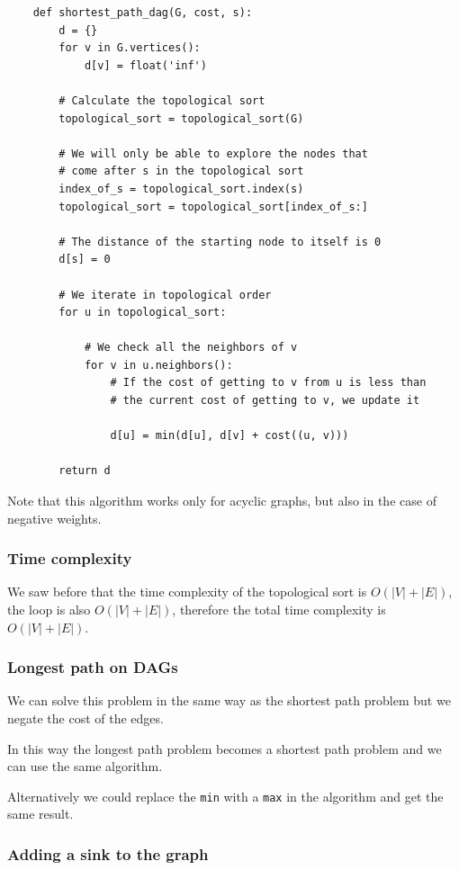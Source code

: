\documentclass[12pt]{extarticle}
\begin{document}
\begin{verbatim}
    def shortest_path_dag(G, cost, s):
        d = {}
        for v in G.vertices():
            d[v] = float('inf')

        # Calculate the topological sort
        topological_sort = topological_sort(G)

        # We will only be able to explore the nodes that
        # come after s in the topological sort
        index_of_s = topological_sort.index(s)
        topological_sort = topological_sort[index_of_s:]

        # The distance of the starting node to itself is 0
        d[s] = 0

        # We iterate in topological order
        for u in topological_sort:

            # We check all the neighbors of v
            for v in u.neighbors():
                # If the cost of getting to v from u is less than
                # the current cost of getting to v, we update it
                
                d[u] = min(d[u], d[v] + cost((u, v)))

        return d
\end{verbatim}

Note that this algorithm works only for acyclic graphs, but also in the case of negative weights.

\subsubsection{Time complexity}

We saw before that the time complexity of the topological sort is $O(|V| + |E|)$, the loop is also $O(|V| + |E|)$, therefore the total time complexity is $O(|V| + |E|)$.

\subsubsection{Longest path on DAGs}

We can solve this problem in the same way as the shortest path problem but we negate the cost of the edges.

In this way the longest path problem becomes a shortest path problem and we can use the same algorithm.

Alternatively we could replace the \texttt{min} with a \texttt{max} in the algorithm and get the same result.

\subsubsection{Adding a sink to the graph}
\end{document}
